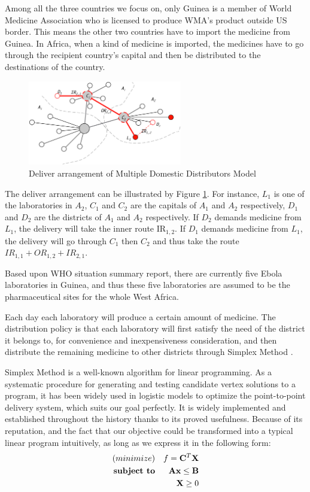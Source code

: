 \documentclass[12pt,a4paper,titlepage]{article}
\begin{document}
Among all the three countries we focus on, only Guinea is a member of World Medicine Association who is licensed to produce WMA's product outside US border. This means the other two countries have to import the medicine from Guinea. In Africa, when a kind of medicine is imported, the medicines have to go through the recipient country's capital and then be distributed to the destinations of the country. 

\begin{figure}[htbp]
\centering
\includegraphics[width=0.6\textwidth]{figures/imgDoubleModelMap.png}
\caption{\label{MultiDemo}Deliver arrangement of Multiple Domestic Distributors Model}
\end{figure}

The deliver arrangement can be illustrated by Figure \ref{MultiDemo}. For instance, $L_1$ is one of the laboratories in $A_2$, $C_1$ and $C_2$ are the capitals of $A_1$ and $A_2$ respectively, $D_1$ and $D_2$ are the districts of $A_1$ and $A_2$ respectively. If $D_2$ demands medicine from $L_1$, the delivery will take the inner route IR$_{1,2}$. If $D_1$ demands medicine from $L_1$, the delivery will go through $C_1$ then $C_2$ and thus take the route $IR_{1,1}+OR_{1,2}+IR_{2,1}$. 

Based upon WHO situation summary report, there are currently five Ebola laboratories in Guinea, and thus these five laboratories are assumed to be the pharmaceutical sites for the whole West Africa.

Each day each laboratory will produce a certain amount of medicine. The distribution policy is that each laboratory will first satisfy the need of the district it belongs to, for convenience and inexpensiveness consideration, and then distribute the remaining medicine to other districts through Simplex Method \cite{simplex1991}.

Simplex Method is a well-known algorithm for linear programming. As a systematic procedure for generating and testing candidate vertex solutions to a program, it has been widely used in logistic models to optimize the point-to-point delivery system, which suits our goal perfectly. It is widely implemented and established throughout the history thanks to its proved usefulness. Because of its reputation, and the fact that our objective could be transformed into a typical linear program intuitively, as long as we express it in the following form:
\begin{eqnarray}
    \text(minimize )   & &f = \textbf{C$^{T}$X} \\
    \textbf{subject to}& & \textbf{Ax}  \leq  \textbf{B}\\
                       & & \textbf{X} \geq 0
\end{eqnarray}
\end{document}
